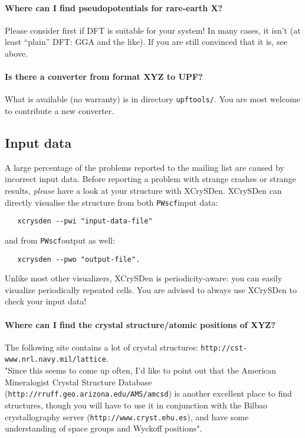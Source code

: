 \documentclass[12pt,a4paper]{article}
\def\PWscf{\texttt{PWscf}}
\begin{document}
\paragraph{Where can I find pseudopotentials for rare-earth X?}

Please consider first if DFT is suitable for your system! In many cases, 
it isn't (at least ``plain'' DFT: GGA and the like). If you are still
convinced that it is, see above.

\paragraph{Is there a converter from format XYZ to UPF?}

What is available (no warranty) is in directory \texttt{upftools/}.
You are most welcome to contribute a new converter.

\subsection{Input data}

A large percentage of the problems reported to the mailing list are
caused by incorrect input data. Before reporting a problem with
strange crashes or strange results, {\em please} have
a look at your structure with XCrySDen. XCrySDen can directly
visualise the structure from both \PWscf input data:
\begin{verbatim}
   xcrysden --pwi "input-data-file"
\end{verbatim}
and from \PWscf output as well:
\begin{verbatim}
   xcrysden --pwo "output-file".
\end{verbatim}
Unlike most other visualizers, XCrySDen is periodicity-aware: you can
easily visualize periodically repeated cells.
You are advised to always use XCrySDen to check your input data! 

\paragraph{Where can I find the crystal structure/atomic positions of XYZ?}

The following site contains a lot of crystal structures: 
\texttt{http://cst-www.nrl.navy.mil/lattice}.\\
"Since this seems to come up often, I'd like to point out that the
American Mineralogist Crystal Structure Database
(\texttt{http://rruff.geo.arizona.edu/AMS/amcsd}) 
is another excellent place to
find structures, though you will have to use it in conjunction with
the Bilbao crystallography server (\texttt{http://www.cryst.ehu.es}),  
and have some understanding of space groups and Wyckoff positions".
\end{document}
